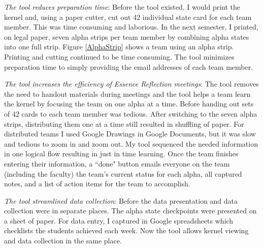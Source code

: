 \documentclass[preprint,12pt,3p]{elsarticle}
\begin{document}
\textit{The tool reduces preparation time}: Before the tool existed, I would print the kernel and, using a paper cutter, cut out 42 individual state card for each team member. This was time consuming and laborious.  In the next semester, I printed, on legal paper, seven alpha strips per team member by combining alpha states into one full strip. Figure \ref{AlphaStrip} shows a team using an alpha strip. Printing and cutting continued to be time consuming. The tool minimizes preparation time to simply providing the email addresses of each team member. 

\textit{The tool increases the efficiency of Essence Reflection meetings}: The tool removes the need to handout materials during meetings and the tool helps a team learn the kernel by focusing the team on one alpha at a time. Before handing out sets of 42 cards to each team member was tedious. After switching to the seven alpha strips, distributing them one at a time still resulted in shuffling of paper. For distributed teams I used Google Drawings in Google Documents, but it was slow and tedious to zoom in and zoom out. My tool sequenced the needed information in one logical flow  resulting in just in time learning. Once the team finishes entering their information, a ``done" button emails everyone on the team (including the faculty) the team's current status for each alpha, all captured notes, and a list of action items for the team to accomplish. 

\textit{The tool streamlined data collection}: Before the data presentation and data collection were in separate places. The alpha state checkpoints were presented on a sheet of paper. For data entry, I captured in Google spreadsheets which checklists the students achieved each week. Now the tool allows kernel viewing and data collection in the same place. 

\end{document}
